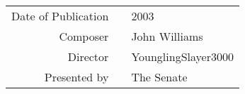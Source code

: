 \makeatletter
\begin{titlepage}
   \centering
   \vspace*{2.5cm}
   {\huge \@title \par}
   \vspace{0.2cm}
   {\Large \textit{\@subtitle} \par}
   \vspace{0.6cm}
   {\Large \@author \par}
   \vspace{0.2cm}
   {\small \@date}
   \vfill
   \begin{abstract} \noindent 
      \lipsum[1-1]
   \end{abstract}

   \vfill
   \vfill
   \vfill
   \begin{tabular}{r c l}
      Date of Publication& & 2003\\
      Composer & & John Williams\\
      Director & & YounglingSlayer3000\\
      Presented by & & The Senate\\
   \end{tabular}
\end{titlepage}
\makeatother
